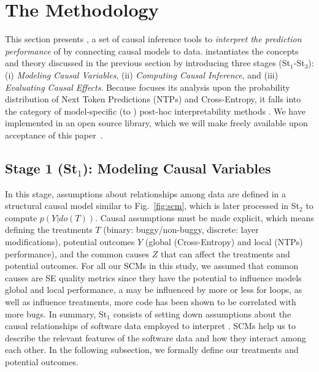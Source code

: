 \section{The \codegen Methodology }
\label{sec:approach-conditioned}

This section presents \codegen, a set of causal inference tools to \textit{interpret the prediction performance} of \nlms by connecting causal models to data. \codegen instantiates the concepts and theory discussed in the previous section by introducing three stages (St$_1$-St$_3$): (i) \textit{Modeling Causal Variables}, (ii) \textit{Computing Causal Inference}, and (iii) \textit{Evaluating Causal Effects}. Because \codegen focuses its analysis upon the probability distribution of Next Token Predictions (NTPs) and Cross-Entropy, it falls into the category of model-specific (\ie to \nlms) post-hoc interpretability methods \citep{molnar2019interpret}. We have implemented \codegen in an open source library, which we will make freely available upon acceptance of this paper~\citep{icodegen}.

\subsection{Stage 1 (St$_1$): Modeling Causal Variables}
In this stage, assumptions about relationships among data are defined in a structural causal model similar to Fig.~\ref{fig:scm}, which is later processed in St$_2$ to compute $p(Y|do(T))$. Causal assumptions must be made explicit, which means defining the treatments $T$ (\ie binary: buggy/non-buggy, discrete: layer modifications), potential outcomes $Y$ (\ie global (Cross-Entropy) and local (NTPs) performance), and the common causes $Z$ that can affect the treatments and potential outcomes. For all our SCMs in this study, we assumed that common causes are SE quality metrics since they have the potential to influence models global and local performance, \ie a \nlm may be influenced by more or less for loops, as well as influence treatments, \ie more code has been shown to be correlated with more bugs. In summary, St$_1$ consists of setting down assumptions about the causal relationships of software data employed to interpret \nlms. SCMs help us to describe the relevant features of the software data and how they interact among each other. In the following subsection, we formally define our treatments and potential outcomes.  

